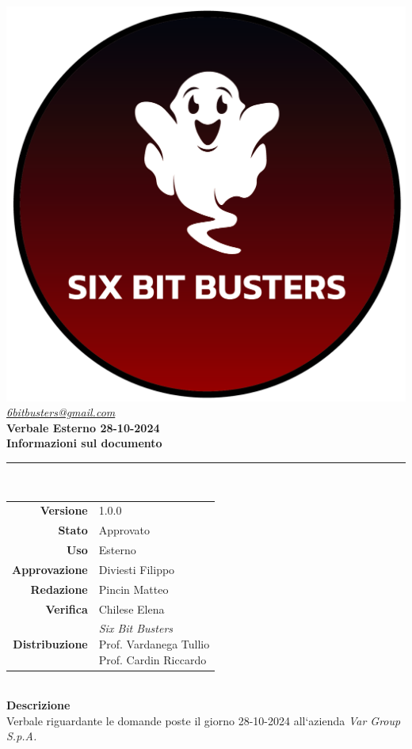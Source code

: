\thispagestyle{empty}
\renewcommand{\arraystretch}{1.3}


\begin{titlepage}
	\begin{center}
		
	\includegraphics[scale = 0.7]{template/images/logo-circle.png}
	\\[1cm]
	\href{mailto:6bitbusters@gmail.com}		      	
	{\large{\textit{6bitbusters@gmail.com} } }\\[1cm]
	
	\Huge \textbf{Verbale Esterno 28-10-2024} \\[1cm]

	\large \textbf{Informazioni sul documento} \\
	\rule{0.6\textwidth}{0.4pt}
	\\[0.5cm]
	\begin{tabular}{r|l}
		\textbf{Versione} & 1.0.0\\
		\textbf{Stato} & Approvato\\
		\textbf{Uso} & Esterno\\                         
		\textbf{Approvazione} & Diviesti Filippo \\                      
		\textbf{Redazione} & Pincin Matteo\\ 
		\textbf{Verifica} & Chilese Elena\\                         
		\textbf{Distribuzione} & \parbox[t]{5cm}{ \textit{Six Bit Busters} \\ Prof. Vardanega Tullio 
	 \\ Prof. Cardin Riccardo}
	\end{tabular}	
	\\[1.2cm]

	\large \textbf{Descrizione} \\
	Verbale riguardante le domande poste il giorno 28-10-2024 all`azienda \textit{Var Group S.p.A.}
	
	\end{center}
\end{titlepage}
